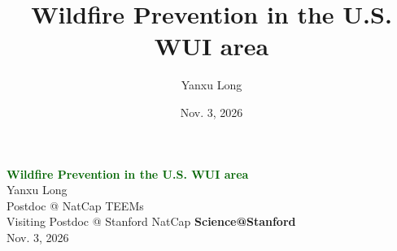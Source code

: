 \documentclass[10pt,aspectratio=169]{beamer}
\title{Wildfire Prevention in the U.S. WUI area}
\subtitle{}
\author{Yanxu Long}
\date{Nov. 3, 2026}
\begin{document}
\begin{frame}[plain]
  \centering
  \vspace{1.3cm}
  {\Large \textcolor{darkgreen}{\textbf{Wildfire Prevention in the U.S. WUI area}}} \\[0.9em]
  \vspace{1.6em}
  {\normalsize Yanxu Long} \\[0.7em]
  {\small Postdoc @ NatCap TEEMs} \\[0.25em]
  {\small Visiting Postdoc @ Stanford NatCap}
  \vfill
  {\normalsize \textbf{Science@Stanford}} \\
  {\small Nov. 3, 2026}
\end{frame}

\end{document}
